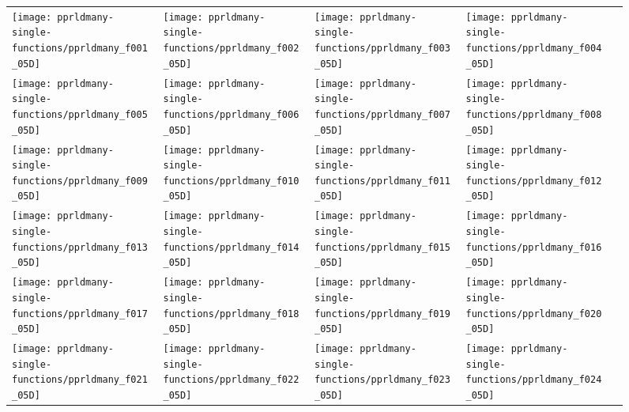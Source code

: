 \documentclass[sigconf]{acmart}
\begin{document}
{%
\begin{figure*}
\centering
\begin{tabular}{@{}l@{}l@{}l@{}l@{}l@{}}
\texttt{[image: pprldmany-single-functions/pprldmany\_f001\_05D]}&
\texttt{[image: pprldmany-single-functions/pprldmany\_f002\_05D]}&
\texttt{[image: pprldmany-single-functions/pprldmany\_f003\_05D]}&
\texttt{[image: pprldmany-single-functions/pprldmany\_f004\_05D]}\\
\texttt{[image: pprldmany-single-functions/pprldmany\_f005\_05D]}&
\texttt{[image: pprldmany-single-functions/pprldmany\_f006\_05D]}&
\texttt{[image: pprldmany-single-functions/pprldmany\_f007\_05D]}&
\texttt{[image: pprldmany-single-functions/pprldmany\_f008\_05D]}\\
\texttt{[image: pprldmany-single-functions/pprldmany\_f009\_05D]}&
\texttt{[image: pprldmany-single-functions/pprldmany\_f010\_05D]}&
\texttt{[image: pprldmany-single-functions/pprldmany\_f011\_05D]}&
\texttt{[image: pprldmany-single-functions/pprldmany\_f012\_05D]}\\
\texttt{[image: pprldmany-single-functions/pprldmany\_f013\_05D]}&
\texttt{[image: pprldmany-single-functions/pprldmany\_f014\_05D]}&
\texttt{[image: pprldmany-single-functions/pprldmany\_f015\_05D]}&
\texttt{[image: pprldmany-single-functions/pprldmany\_f016\_05D]}\\
\texttt{[image: pprldmany-single-functions/pprldmany\_f017\_05D]}&
\texttt{[image: pprldmany-single-functions/pprldmany\_f018\_05D]}&
\texttt{[image: pprldmany-single-functions/pprldmany\_f019\_05D]}&
\texttt{[image: pprldmany-single-functions/pprldmany\_f020\_05D]}\\
\texttt{[image: pprldmany-single-functions/pprldmany\_f021\_05D]}&
\texttt{[image: pprldmany-single-functions/pprldmany\_f022\_05D]}&
\texttt{[image: pprldmany-single-functions/pprldmany\_f023\_05D]}&
\texttt{[image: pprldmany-single-functions/pprldmany\_f024\_05D]}
\end{tabular}
 \caption{\label{fig:ECDFsingleOne}
}
\end{figure*}


}
\end{document}
